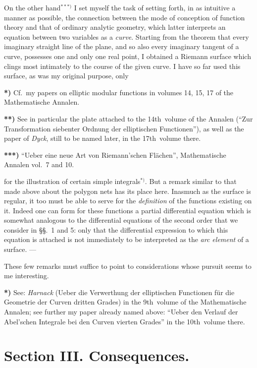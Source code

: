 \documentclass{article}
\begin{document}
On the other hand${}^{***)}$ I set myself the task of setting forth, in as intuitive a manner as possible, the connection between the mode of conception of function theory and that of ordinary analytic geometry, which latter interprets an equation between two variables as a \emph{curve}. Starting from the theorem that every imaginary straight line of the plane, and so also every imaginary tangent of a curve, possesses one and only one real point, I obtained a Riemann surface which clings most intimately to the course of the given curve. I have so far used this surface, as was my original purpose, only

\textbf{*)} Cf.\ my papers on elliptic modular functions in volumes 14, 15, 17 of the Mathematische Annalen.

\textbf{**)} See in particular the plate attached to the 14th\ volume of the Annalen (“Zur Transformation siebenter Ordnung der elliptischen Functionen”), as well as the paper of \emph{Dyck}, still to be named later, in the 17th\ volume there.

\textbf{***)} “Ueber eine neue Art von Riemann'schen Flächen”, Mathematische Annalen vol.~7 and 10.

for the illustration of certain simple integrals${}^{*)}$. But a remark similar to that made above about the polygon nets has its place here. Inasmuch as the surface is regular, it too must be able to serve for the \emph{definition} of the functions existing on it. Indeed one can form for these functions a partial differential equation which is somewhat analogous to the differential equations of the second order that we consider in §§.~1 and 5: only that the differential expression to which this equation is attached is not immediately to be interpreted as the \emph{arc element} of a surface. ---

These few remarks must suffice to point to considerations whose pursuit seems to me interesting.

\textbf{*)} See: \emph{Harnack} (Ueber die Verwerthung der elliptischen Functionen für die Geometrie der Curven dritten Grades) in the 9th\ volume of the Mathematische Annalen; see further my paper already named above: “Ueber den Verlauf der Abel'schen Integrale bei den Curven vierten Grades” in the 10th\ volume there.


\section*{Section III. Consequences.}
\end{document}
